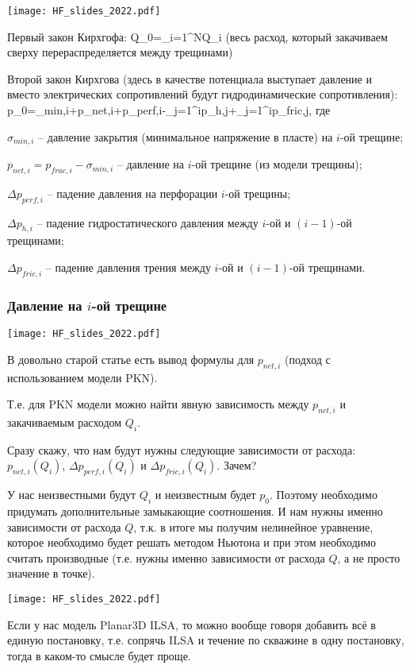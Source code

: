\documentclass[main.tex]{subfiles}
\begin{document}
\texttt{[image: HF\_slides\_2022.pdf]}

Первый закон Кирхгофа:
\beq
Q_0=\sum_{i=1}^{N}{Q_i}
\eeq
(весь расход, который закачиваем сверху перераспределяется между трещинами)

Второй закон Кирхгова (здесь в качестве потенциала выступает давление и вместо электрических сопротивлений будут гидродинамические сопротивления):
\beq
p_0=\sigma_{min,i}+p_{net,i}+\Delta p_{perf,i}-\sum_{j=1}^{i}{\Delta p_{h,j}}+\sum_{j=1}^{i}\Delta p_{fric,j},
\eeq
где

$\sigma_{min,i}$ -- давление закрытия (минимальное напряжение в пласте) на $i$-ой трещине;

$p_{net,i}=p_{frac,i}-\sigma_{min,i}$ -- давление на $i$-ой трещине (из модели трещины);

$\Delta p_{perf,i}$ -- падение давления на перфорации $i$-ой трещины;

$\Delta p_{h,i}$ -- падение гидростатического давления между $i$-ой и $(i-1)$-ой трещинами;

$\Delta p_{fric,i}$ -- падение давления трения между $i$-ой и $(i-1)$-ой трещинами.

\subsubsection{Давление на $i$-ой трещине}

\texttt{[image: HF\_slides\_2022.pdf]}

В довольно старой статье есть вывод формулы для $p_{net,i}$ (подход с использованием модели PKN).

Т.е. для PKN модели можно найти явную зависимость между $p_{net,i}$ и закачиваемым расходом $Q_i$.

Сразу скажу, что нам будут нужны следующие зависимости от расхода: $p_{net,i}(Q_i)$, $\Delta p_{perf,i}(Q_i)$ и $\Delta p_{fric,i}(Q_i)$.
Зачем?

У нас неизвестными будут $Q_i$ и неизвестным будет $p_0$.
Поэтому необходимо придумать дополнительные замыкающие соотношения.
И нам нужны именно зависимости от расхода $Q$, т.к. в итоге мы получим нелинейное уравнение, которое необходимо будет решать методом Ньютона и при этом необходимо считать производные (т.е. нужны именно зависимости от расхода $Q$, а не просто значение в точке).

\texttt{[image: HF\_slides\_2022.pdf]}

Если у нас модель Planar3D ILSA, то можно вообще говоря добавить всё в единую постановку, т.е. сопрячь ILSA и течение по скважине в одну постановку, тогда в каком-то смысле будет проще.
\end{document}
